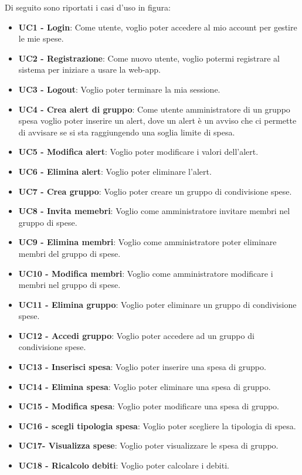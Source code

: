 Di seguito sono riportati i casi d'uso in figura:
\begin{itemize}
    \item \textbf{UC1 - Login}: Come utente, voglio poter accedere al mio account per gestire le mie spese.
    \item \textbf{UC2 - Registrazione}: Come nuovo utente, voglio potermi registrare al sistema per iniziare a usare la web-app.
    \item \textbf{UC3 - Logout}: Voglio poter terminare la mia sessione.
    \item \textbf{UC4 - Crea alert di gruppo}: Come utente amministratore di un gruppo spesa voglio poter inserire un alert, dove un alert è un avviso che ci permette di avvisare se si sta raggiungendo una soglia limite di spesa.
    \item \textbf{UC5 - Modifica alert}: Voglio poter modificare i valori dell'alert.
    \item \textbf{UC6 - Elimina alert}: Voglio poter eliminare l'alert. 
    \item \textbf{UC7 - Crea gruppo}: Voglio poter creare un gruppo di condivisione spese. 
    \item \textbf{UC8 - Invita memebri}: Voglio come amministratore invitare membri nel gruppo di spese.
    \item \textbf{UC9 - Elimina membri}: Voglio come amministratore poter eliminare membri del gruppo di spese.
    \item \textbf{UC10 - Modifica membri}: Voglio come amministratore modificare i membri nel gruppo di spese.
    \item \textbf{UC11 - Elimina gruppo}: Voglio poter eliminare un gruppo di condivisione spese. 
    \item \textbf{UC12 - Accedi gruppo}: Voglio poter accedere ad un gruppo di condivisione spese. 
    \item \textbf{UC13 - Inserisci spesa}: Voglio poter inserire una spesa di gruppo.
    \item \textbf{UC14 - Elimina spesa}: Voglio poter eliminare una spesa di gruppo.
    \item \textbf{UC15 - Modifica spesa}: Voglio poter modificare una spesa di gruppo.
    \item \textbf{UC16 - scegli tipologia spesa}: Voglio poter scegliere la tipologia di spesa.
    \item \textbf{UC17- Visualizza spese}: Voglio poter visualizzare le spesa di gruppo.
    \item \textbf{UC18 - Ricalcolo debiti}: Voglio poter calcolare i debiti.

\end{itemize}
